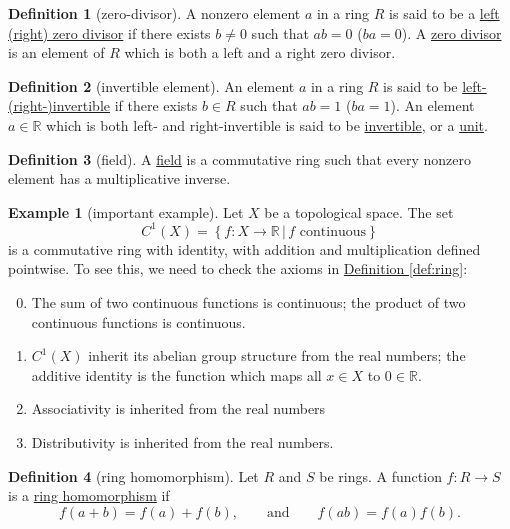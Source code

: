 \documentclass[a4paper]{report}
\newcommand{\R}{\mathbb{R}}
\newcommand{\defn}[1]{\ul{#1}}
\theoremstyle{definition}
\newtheorem{definition}{Definition}[section]
\newtheorem{example}{Example}[section]
\theoremstyle{plain}
\theoremstyle{remark}
\begin{document}
\begin{definition}[zero-divisor]
  \label{def:zerodivisor}
  A nonzero element $a$ in a ring $R$ is said to be a \defn{left (right) zero divisor} if there exists $b \neq 0$ such that $ab=0$ ($ba=0$). A \defn{zero divisor} is an element of $R$ which is both a left and a right zero divisor.
\end{definition}

\begin{definition}[invertible element]
  \label{def:ringinvertible}
  An element $a$ in a ring $R$ is said to be \defn{left- (right-)invertible} if there exists $b \in R$ such that $ab=1$ ($ba=1$). An element $a \in \R$ which is both left- and right-invertible is said to be \defn{invertible}, or a \defn{unit}.
\end{definition}

\begin{definition}[field]
  \label{def:field}
  A \defn{field} is a commutative ring such that every nonzero element has a multiplicative inverse.
\end{definition}

\begin{example}[important example]
  Let $X$ be a topological space. The set
  \begin{equation*}
    C^{1}(X) = \left\{ f\colon X \to \R\,\big|\, f \text{ continuous} \right\}
  \end{equation*}
  is a commutative ring with identity, with addition and multiplication defined pointwise. To see this, we need to check the axioms in \hyperref[def:ring]{Definition \ref*{def:ring}}:
  \begin{enumerate}
      \setcounter{enumi}{-1}
    \item The sum of two continuous functions is continuous; the product of two continuous functions is continuous.
    \item $C^{1}(X)$ inherit its abelian group structure from the real numbers; the additive identity is the function which maps all $x \in X$ to $0 \in \R$.
    \item Associativity is inherited from the real numbers
    \item Distributivity is inherited from the real numbers.
  \end{enumerate}
\end{example}

\begin{definition}[ring homomorphism]
  \label{def:ringhomomorphism}
  Let $R$ and $S$ be rings. A function $f\colon R \to S$ is a \defn{ring homomorphism} if
  \begin{equation*}
    f(a+b) = f(a) + f(b), \qquad \text{and}\qquad f(ab) = f(a)f(b).
  \end{equation*}
\end{definition}
\end{document}
